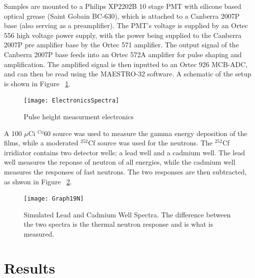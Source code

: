 \documentclass{anstrans}
\newcommand{\iso}[2]{${}^{#2}${#1}}
\begin{document}
Samples are mounted to a Philips XP2202B 10 stage PMT with silicone based optical grease (Saint Gobain BC-630), which is attached to a Canberra 2007P base (also serving as a preamplifier).   
The PMT's voltage is supplied by an Ortec 556 high voltage power supply, with the power being supplied to the Canberra 2007P pre amplifier base by the Ortec 571 amplifier.  
The output signal of the Canberra 2007P base feeds into an Ortec 572A amplifier for pulse shaping and amplification. 
The amplified signal is then inputted to an Ortec 926 MCB-ADC, and can then be read using the MAESTRO-32 software. 
A schematic of the setup is shown in Figure ~\ref{fig:ElectronicsSpectra}.
\begin{figure}
	\centering
	\texttt{[image: ElectronicsSpectra]}
	\caption{Pulse height measurment electronics}
	\label{fig:ElectronicsSpectra}
\end{figure}
A 100 $\mu$Ci \iso{60}{Co} source was used to measure the gamma energy deposition of the films, while a moderated \iso{Cf}{252} source was used for the neutrons.
The \iso{Cf}{252} irridiator contains two detector wells; a lead well and a cadmium well.
The lead well measures the reponse of neutron of all energies, while the cadmium well measures the responses of fast neutrons.
The two responses are then subtracted, as shwon in Figure ~\ref{fig:SimPbCdSpectra}.
\begin{figure}
	\centering
	\texttt{[image: Graph19N]}
	\caption{Simulated Lead and Cadmium Well Spectra. The difference between the two spectra is the thermal neutron response and is what is measured.}
	\label{fig:SimPbCdSpectra}
\end{figure}
\section{Results}
\end{document}
